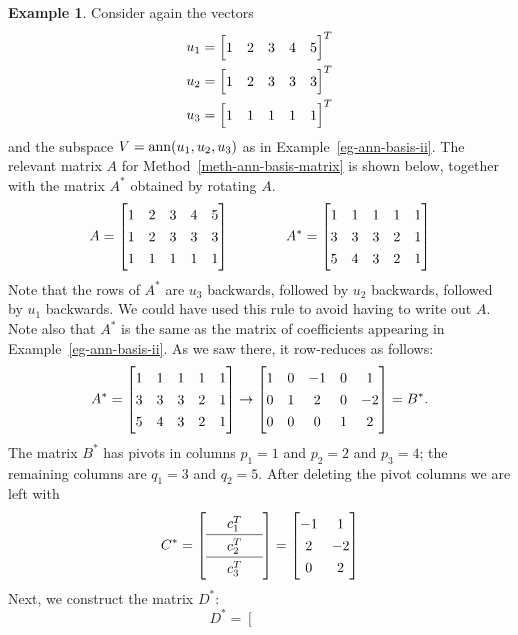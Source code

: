 \documentclass[reqno]{amsart}
\theoremstyle{definition}
\newtheorem{example}[theorem]{Example}
\begin{document}
\begin{example}\label{eg-ann-basis-matrix-ii}
 Consider again the vectors
 \begin{align*}
  u_1 &= \bbm 1 & 2 & 3 & 4 & 5 \ebm^T \\
  u_2 &= \bbm 1 & 2 & 3 & 3 & 3 \ebm^T \\
  u_3 &= \bbm 1 & 1 & 1 & 1 & 1 \ebm^T
 \end{align*}
 and the subspace $V=\operatorname{ann}(u_1,u_2,u_3)$ as in
 Example~\ref{eg-ann-basis-ii}.  The relevant matrix $A$ for
 Method~\ref{meth-ann-basis-matrix} is shown below, together with the matrix
 $A^*$ obtained by rotating $A$.
 \[ A = \bbm
      1 & 2 & 3 & 4 & 5 \\
      1 & 2 & 3 & 3 & 3 \\
      1 & 1 & 1 & 1 & 1
    \ebm \hspace{4em}
    A^* = \bbm
      1 & 1 & 1 & 1 & 1 \\
      3 & 3 & 3 & 2 & 1 \\
      5 & 4 & 3 & 2 & 1
    \ebm
 \]
 Note that the rows of $A^*$ are $u_3$ backwards, followed by $u_2$
 backwards, followed by $u_1$ backwards.  We could have used this rule
 to avoid having to write out $A$.  Note also that $A^*$ is the same
 as the matrix of coefficients appearing in
 Example~\ref{eg-ann-basis-ii}.  As we saw there, it row-reduces as
 follows:
 \[ A^* =
    \bbm
      1 & 1 & 1 & 1 & 1 \\
      3 & 3 & 3 & 2 & 1 \\
      5 & 4 & 3 & 2 & 1
    \ebm
    \to
    \bbm
      1 & 0 &-1 & 0 & 1 \\
      0 & 1 & 2 & 0 &-2 \\
      0 & 0 & 0 & 1 & 2
    \ebm
   = B^*.
 \]
 The matrix $B^*$ has pivots in columns $p_1=1$ and
 $p_2=2$ and $p_3=4$; the remaining columns are $q_1=3$ and $q_2=5$.
 After deleting the pivot columns we are left with
 \[ C^* = {\renewcommand{\arraystretch}{1.3}
      \left[\begin{array}{ccc}
        & c_1^T & \\ \hline
        & c_2^T & \\ \hline
        & c_3^T &
      \end{array}\right]}
      = \bbm -1 &  1 \\
              2 & -2 \\
              0 &  2 \ebm
 \]
  Next, we construct the matrix $D^*$:
  \[ D^* =
      \left[\begin{array}{c|c|c|c|c}
        &&&& \\

\end{array}\]
\end{example}
\end{document}
